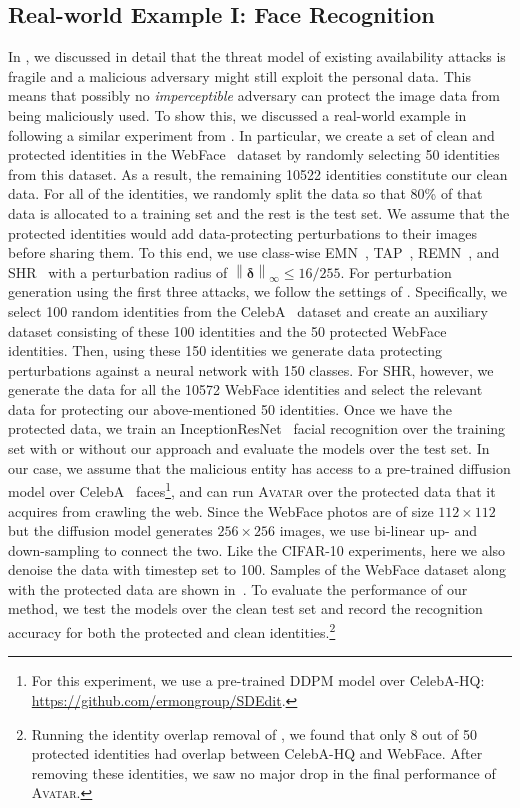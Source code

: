 \documentclass[conference]{IEEEtran}
\theoremstyle{definition}
\theoremstyle{remark}
\theoremstyle{proposition}
\newcommand{\norm}[1]{\left\lVert#1\right\rVert}
\begin{document}
\subsection{Real-world Example I: Face Recognition}\label{sec:sec:real_world}
In , we discussed in detail that the threat model of existing availability attacks is fragile and a malicious adversary might still exploit the personal data.
This means that possibly no \textit{imperceptible} adversary can protect the image data from being maliciously used.
To show this, we discussed a real-world example in  following a similar experiment from \citet{huang2021emn}.
In particular, we create a set of clean and protected identities in the WebFace~\citep{yi2014} dataset by randomly selecting 50 identities from this dataset.
As a result, the remaining 10522 identities constitute our clean data.
For all of the identities, we randomly split the data so that 80\% of that data is allocated to a training set and the rest is the test set.
We assume that the protected identities would add data-protecting perturbations to their images before sharing them.
To this end, we use class-wise EMN~\citep{huang2021emn}, TAP~\citep{fowl2021tap}, REMN~\citep{fu2022remn}, and SHR~\citep{yu2022shr} with a perturbation radius of $\norm{\boldsymbol{\delta}}_{\infty} \leq 16/255$.
For perturbation generation using the first three attacks, we follow the settings of \citet{huang2021emn}.
Specifically, we select 100 random identities from the CelebA~\citep{liu2015deep} dataset and create an auxiliary dataset consisting of these 100 identities and the 50 protected WebFace~\citep{yi2014} identities.
Then, using these 150 identities we generate data protecting perturbations against a neural network with 150 classes.
For SHR, however, we generate the data for all the 10572 WebFace identities and select the relevant data for protecting our above-mentioned 50 identities.
Once we have the protected data, we train an InceptionResNet~\citep{szegedy2017inception} facial recognition over the training set with or without our approach and evaluate the models over the test set.
In our case, we assume that the malicious entity has access to a pre-trained diffusion model over CelebA~\cite{liu2015deep} faces\footnote{For this experiment, we use a pre-trained DDPM model over CelebA-HQ: \url{https://github.com/ermongroup/SDEdit}.}, and can run \textsc{Avatar} over the protected data that it acquires from crawling the web.
Since the WebFace photos are of size ${112 \times 112}$ but the diffusion model generates ${256 \times 256}$ images, we use bi-linear up- and down-sampling to connect the two.
Like the CIFAR-10 experiments, here we also denoise the data with timestep set to 100.
Samples of the WebFace dataset along with the protected data are shown in~.
To evaluate the performance of our method, we test the models over the clean test set and record the recognition accuracy for both the protected and clean identities.\footnote{Running the identity overlap removal of \citet{wang2018additive}, we found that only 8 out of 50 protected identities had overlap between CelebA-HQ and WebFace. After removing these identities, we saw no major drop in the final performance of \textsc{Avatar}.}
\end{document}
